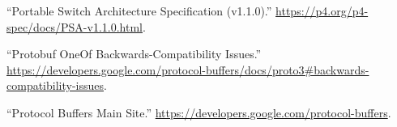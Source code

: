 \documentclass[11pt]{article}
\begin{document}
{{\begin{thebibliography}{37}
\mdbibitemlabel{{}[18]}\textquotedblleft{}Portable Switch Architecture Specification (v1.1.0).\textquotedblright{} \href{https://p4.org/p4-spec/docs/PSA-v1.1.0.html}{{\ttfamily https://\hspace{0pt}p4.\hspace{0pt}org/\hspace{0pt}p4-\hspace{0pt}spec/\hspace{0pt}docs/\hspace{0pt}PSA-\hspace{0pt}v1.\hspace{0pt}1.\hspace{0pt}0.\hspace{0pt}html}}.\label{psa}%

\mdbibitemlabel{{}[19]}\textquotedblleft{}Protobuf OneOf Backwards-Compatibility Issues.\textquotedblright{} \href{https://developers.google.com/protocol-buffers/docs/proto3\%23backwards-compatibility-issues}{{\ttfamily https://\hspace{0pt}developers.\hspace{0pt}google.\hspace{0pt}com/\hspace{0pt}protocol-\hspace{0pt}buffers/\hspace{0pt}docs/\hspace{0pt}proto3\#\hspace{0pt}backwards-\hspace{0pt}compatibility-\hspace{0pt}issues}}.\label{protooneofbackwardscompatibility}%

\mdbibitemlabel{{}[20]}\textquotedblleft{}Protocol Buffers Main Site.\textquotedblright{} \href{https://developers.google.com/protocol-buffers}{{\ttfamily https://\hspace{0pt}developers.\hspace{0pt}google.\hspace{0pt}com/\hspace{0pt}protocol-\hspace{0pt}buffers}}.\label{proto}%


\end{thebibliography}}}
\end{document}
